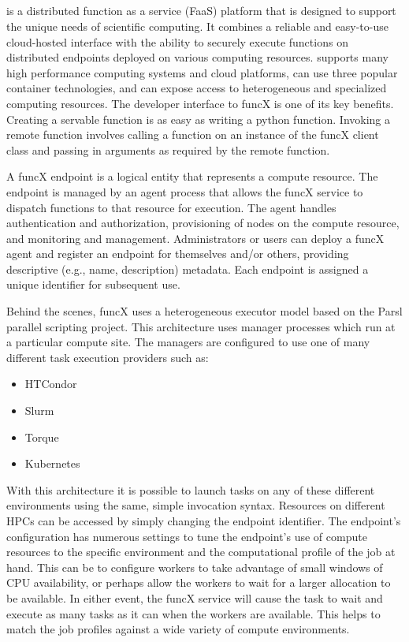 \subsection{\funcX{}}\label{subsec:funcX}
\funcX{} is a distributed  function as a service (FaaS) platform that is designed to support the unique needs of scientific computing. It combines a reliable and easy-to-use cloud-hosted interface with the ability to securely execute functions on distributed endpoints deployed on various computing resources. \funcX{} supports many high performance computing systems and cloud platforms, can use three popular container technologies, and can expose access to heterogeneous and specialized computing resources. The developer interface to funcX is one of its key benefits. Creating a servable function is as easy as writing a python function. Invoking a remote function involves calling a function on an instance of the funcX client class and passing in arguments as required by the remote function.

A funcX endpoint is a logical entity that represents a compute resource. The endpoint is managed by an agent process that allows the funcX service to dispatch functions to that resource for execution. The agent handles authentication and authorization, provisioning of nodes on the compute resource, and monitoring and management. Administrators or users can deploy a funcX agent and register an endpoint for themselves and/or others, providing descriptive (e.g., name, description) metadata. Each endpoint is assigned a unique identifier for subsequent use.

Behind the scenes, funcX uses a heterogeneous executor model based on the Parsl parallel scripting project.  This architecture uses manager processes which run at a particular compute site. The managers are configured to use one of many different task execution providers such as:
\begin{itemize}
\item HTCondor
\item Slurm
\item Torque
\item Kubernetes
\end{itemize}

With this architecture it is possible to launch tasks on any of these different environments using the same, simple invocation syntax. Resources on different HPCs can be accessed by simply changing the endpoint identifier. The endpoint's configuration has numerous settings to tune the endpoint's use of compute resources to the specific environment and the computational profile of the job at hand. This can be to configure workers to take advantage of small windows of CPU availability, or perhaps allow the workers to wait for a larger allocation to be available. In either event, the funcX service will cause the task to wait and execute as many tasks as it can when the workers are available.  This helps to match the job profiles against a wide variety of compute environments.
